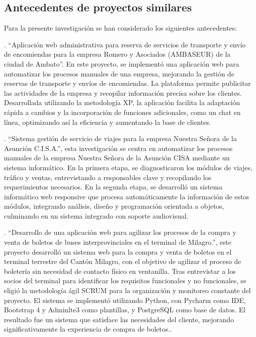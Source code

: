 \documentclass[12pt,letterpaper]{article}
\begin{document}
\subsection{Antecedentes de proyectos similares}

Para la presente investigación se han considerado los siguientes antecedentes:

\textcite{hurtado2019aplicacion}. ``Aplicación web administrativa para reserva de servicios de transporte y envío de encomiendas para la empresa Romero y Asociados (AMBASEUR) de la ciudad de Ambato''. En este proyecto, se implementó una aplicación web para automatizar los procesos manuales de una empresa, mejorando la gestión de reservas de transporte y envíos de encomiendas. La plataforma permite publicitar las actividades de la empresa y recopilar información precisa sobre los clientes. Desarrollada utilizando la metodología XP, la aplicación facilita la adaptación rápida a cambios y la incorporación de funciones adicionales, como un chat en línea, optimizando así la eficiencia y aumentando la base de clientes.

\textcite{mora2022sistema}. ``Sistema gestión de servicio de viajes para la empresa Nuestra Señora de la Asunción C.I.S.A.'', esta investigación se centra en automatizar los procesos manuales de la empresa Nuestra Señora de la Asunción CISA mediante un sistema informático. En la primera etapa, se diagnosticaron los módulos de viajes, tráfico y ventas, entrevistando a responsables clave y recopilando los requerimientos necesarios. En la segunda etapa, se desarrolló un sistema informático web responsive que procesa automáticamente la información de estos módulos, integrando análisis, diseño y programación orientada a objetos, culminando en un sistema integrado con soporte audiovisual.

\textcite{arevalo2021desarrollo}. ``Desarrollo de una aplicación web para
agilizar los procesos de la compra y venta de boletos de buses interprovinciales en el terminal de Milagro.'', este proyecto desarrolló un sistema web para la compra y venta de boletos en el terminal terrestre del Cantón Milagro, con el objetivo de agilizar el proceso de boletería sin necesidad de contacto físico en ventanilla. Tras entrevistar a los socios del terminal para identificar los requisitos funcionales y no funcionales, se eligió la metodología ágil SCRUM para la organización y monitoreo constante del proyecto. El sistema se implementó utilizando Python, con Pycharm como IDE, Bootstrap 4 y Adminlte3 como plantillas, y PostgreSQL como base de datos. El resultado fue un sistema que satisface las necesidades del cliente, mejorando significativamente la experiencia de compra de boletos..
\end{document}
